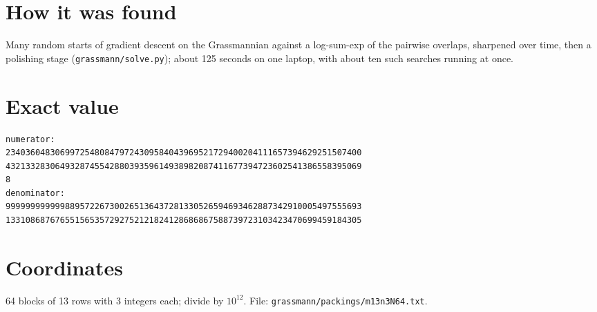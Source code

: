 \documentclass[11pt,a4paper]{article}
\begin{document}
\section{How it was found}
Many random starts of gradient descent on the Grassmannian against a log-sum-exp of the pairwise overlaps, sharpened over time, then a polishing stage (\texttt{grassmann/solve.py}); about 125 seconds on one laptop, with about ten such searches running at once.


\appendix
\section{Exact value}
{\small
\begin{verbatim}
numerator:
234036048306997254808479724309584043969521729400204111657394629251507400
432133283064932874554288039359614938982087411677394723602541386558395069
8
denominator:
999999999999889572267300265136437281330526594693462887342910005497555693
133108687676551565357292752121824128686867588739723103423470699459184305
\end{verbatim}}

\section{Coordinates}
64 blocks of 13 rows with 3 integers each; divide by $10^{12}$. File: \texttt{grassmann/packings/m13n3N64.txt}.
{\tiny
\begin{multicols}{3}
\end{multicols}}
\end{document}
